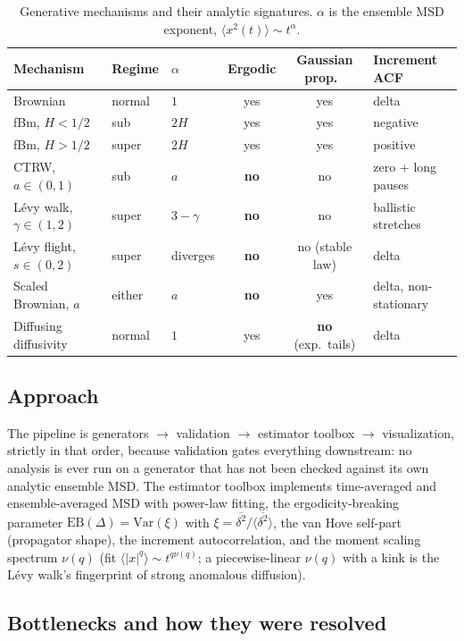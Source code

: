 \documentclass[11pt]{article}
\newcommand{\msd}{\ensuremath{\langle x^2(t)\rangle}}
\begin{document}
\begin{table}[htbp]
\centering
\caption{Generative mechanisms and their analytic signatures. $\alpha$ is the
ensemble MSD exponent, $\msd \sim t^\alpha$.}
\label{tab:mechanisms}
\begin{tabular}{lllccl}
\toprule
Mechanism & Regime & $\alpha$ & Ergodic & Gaussian prop.\ & Increment ACF \\
\midrule
Brownian & normal & $1$ & yes & yes & delta \\
fBm, $H<1/2$ & sub & $2H$ & yes & yes & negative \\
fBm, $H>1/2$ & super & $2H$ & yes & yes & positive \\
CTRW, $a\in(0,1)$ & sub & $a$ & \textbf{no} & no & zero + long pauses \\
L\'evy walk, $\gamma\in(1,2)$ & super & $3-\gamma$ & \textbf{no} & no & ballistic stretches \\
L\'evy flight, $s\in(0,2)$ & super & diverges & \textbf{no} & no (stable law) & delta \\
Scaled Brownian, $a$ & either & $a$ & \textbf{no} & yes & delta, non-stationary \\
Diffusing diffusivity & normal & $1$ & yes & \textbf{no} (exp.\ tails) & delta \\
\bottomrule
\end{tabular}
\end{table}

\subsection{Approach}

The pipeline is generators $\to$ validation $\to$ estimator toolbox $\to$
visualization, strictly in that order, because validation gates everything
downstream: no analysis is ever run on a generator that has not been checked
against its own analytic ensemble MSD. The estimator toolbox implements
time-averaged and ensemble-averaged MSD with power-law fitting, the
ergodicity-breaking parameter $\mathrm{EB}(\Delta)=\mathrm{Var}(\xi)$ with
$\xi=\overline{\delta^2}/\langle\overline{\delta^2}\rangle$, the van Hove
self-part (propagator shape), the increment autocorrelation, and the moment
scaling spectrum $\nu(q)$ (fit $\langle|x|^q\rangle\sim t^{q\nu(q)}$; a
piecewise-linear $\nu(q)$ with a kink is the L\'evy walk's fingerprint of
strong anomalous diffusion).

\subsection{Bottlenecks and how they were resolved}
\label{sec:phase1-bottlenecks}
\end{document}
